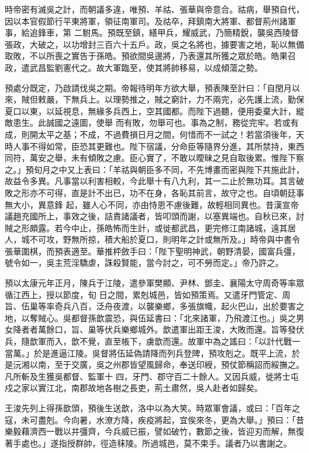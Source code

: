 \begin{pinyinscope}
 時帝密有滅吳之計，而朝議多違，唯預、羊祜、張華與帝意合。祜病，舉預自代，因以本官假節行平東將軍，領征南軍司。及祜卒，拜鎮南大將軍、都督荊州諸軍事，給追鋒車，第
 二駙馬。預既至鎮，繕甲兵，耀威武，乃簡精銳，襲吳西陵督張政，大破之，以功增封三百六十五戶。政，吳之名將也，據要害之地，恥以無備取敗，不以所喪之實告于孫皓。預欲間吳邊將，乃表還其所獲之眾於皓。皓果召政，遣武昌監劉憲代之。故大軍臨至，使其將帥移易，以成傾蕩之勢。



 預處分既定，乃啟請伐吳之期。帝報待明年方欲大舉，預表陳至計曰：「自閏月以來，賊但敕嚴，下無兵上。以理勢推之，賊之窮計，力不兩完，必先護上流，勤保夏口以東，以延視息，無緣多兵西上，空其國都。而陛下過聽，便用委棄大計，縱敵患生。此誠國之遠圖，使舉
 而有敗，勿舉可也。事為之制，務從完牢。若或有成，則開太平之基；不成，不過費損日月之間，何惜而不一試之！若當須後年，天時人事不得如常，臣恐其更難也。陛下宿議，分命臣等隨界分進，其所禁持，東西同符，萬安之舉，未有傾敗之慮。臣心實了，不敢以曖昧之見自取後累。惟陛下察之。」預旬月之中又上表曰：「羊祜與朝臣多不同，不先博畫而密與陛下共施此計，故益令多異。凡事當以利害相較，今此舉十有八九利，其一二止於無功耳。其言破敗之形亦不可得，直是計不出已，功不在身，各恥其前言，故守之也。自頃朝廷事無大小，異意鋒
 起，雖人心不同，亦由恃恩不慮後難，故輕相同異也。昔漢宣帝議趙充國所上，事效之後，詰責諸議者，皆叩頭而謝，以塞異端也。自秋已來，討賊之形頗露。若今中止，孫皓怖而生計，或徙都武昌，更完修江南諸城，遠其居人，城不可攻，野無所掠，積大船於夏口，則明年之計或無所及。」時帝與中書令張華圍棋，而預表適至。華推枰斂手曰：「陛下聖明神武，朝野清晏，國富兵彊，號令如一，吳主荒淫驕虐，誅殺賢能，當今討之，可不勞而定。」帝乃許之。



 預以太康元年正月，陳兵于江陵，遣參軍樊顯、尹林、鄧圭、襄陽太守周奇等率眾循江西上，授以節度，旬
 日之間，累剋城邑，皆如預策焉。又遣牙門管定、周旨、伍巢等率奇兵八百，泛舟夜渡，以襲樂鄉，多張旗幟，起火巴山，出於要害之地，以奪賊心。吳都督孫歆震恐，與伍延書曰：「北來諸軍，乃飛渡江也。」吳之男女降者者萬餘口，旨、巢等伏兵樂鄉城外。歆遣軍出距王浚，大敗而還。旨等發伏兵，隨歆軍而入，歆不覺，直至帳下，虜歆而還。故軍中為之謠曰：「以計代戰一當萬。」於是進逼江陵。吳督將伍延偽請降而列兵登陴，預攻剋之。既平上流，於是沅湘以南，至于交廣，吳之州郡皆望風歸命，奉送印綬，預仗節稱詔而綏撫之。凡所斬及生獲吳都督、監軍十
 四，牙門、郡守百二十餘人。又因兵威，徙將士屯戍之家以實江北，南郡故地各樹之長吏，荊土肅然，吳人赴者如歸矣。



 王浚先列上得孫歆頭，預後生送歆，洛中以為大笑。時眾軍會議，或曰：「百年之寇，未可盡剋。今向暑，水潦方降，疾疫將起，宜俟來冬，更為大舉。」預曰：「昔樂毅藉濟西一戰以并彊齊，今兵威已振，譬如破竹，數節之後，皆迎刃而解，無復著手處也。」遂指授群帥，徑造秣陵。所過城邑，莫不束手。議者乃以書謝之。




\end{pinyinscope}
